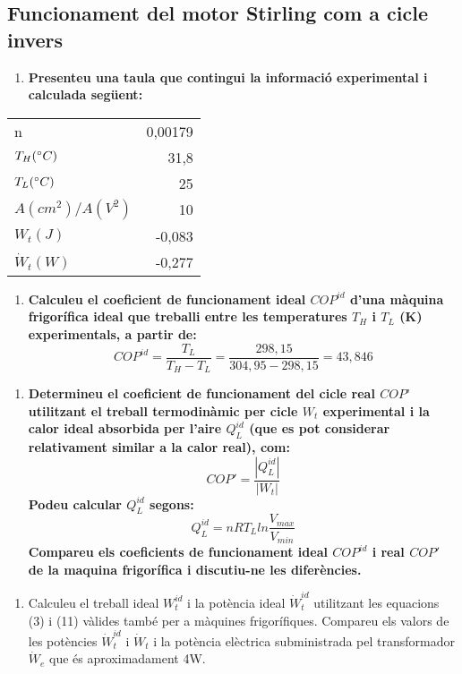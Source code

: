 \documentclass[a4paper]{article}
\begin{document}
\subsection{Funcionament del motor Stirling com a cicle invers}

\begin{enumerate}[resume]
	\item \textbf{Presenteu una taula que contingui la informació experimental i calculada següent:}
\end{enumerate}
\begin{table}[H]
	\centering
	\begin{tabular}{l|r}
		n &  0,00179 \\ 
		$T_H (\degree C)$ & 31,8 \\  
		$T_L (\degree C)$ & 25 \\ 
		$A(cm^2)/A(V^2)$ & 10 \\ 
		$W_t(J)$ & -0,083 \\ 
		$\dot{W}_t (W)$ & -0,277 \\
	\end{tabular}
\end{table}

\begin{enumerate}[resume]
	\item \textbf{Calculeu el coeficient de funcionament ideal $COP^{id}$ d'una màquina frigorífica ideal que treballi entre les temperatures $T_H$ i $T_L$ (K) experimentals, a partir de: }
	$$
	COP^{id} = \frac{T_L}{T_H - T_L} = \frac{298,15}{304,95 - 298,15} = 43,846
	$$
\end{enumerate}

\begin{enumerate}[resume]
	\item \textbf{Determineu el coeficient de funcionament del cicle real $COP’$ utilitzant el treball termodinàmic per cicle $W_t$ experimental i la calor ideal absorbida per l’aire $Q_L^{id}$ (que es pot considerar relativament similar a la calor real), com:}
	$$
	COP' = \frac{|Q_L^{id}|}{|W_t|}
	$$
	\textbf{Podeu calcular $Q_L^{id}$ segons:}
	$$
	Q_L^{id} = nRT_L ln \frac{V_{max}}{V_{min}}
	$$
	\textbf{Compareu els coeficients de funcionament ideal $COP^{id}$ i real $COP'$ de la maquina frigorífica i discutiu-ne les diferències.}
\end{enumerate}

\begin{enumerate}[resume]
	\item Calculeu el treball ideal $W_t^{id}$ i la potència ideal $\dot{W}_t^{id}$ utilitzant les equacions (3) i (11) vàlides també per a màquines frigorífiques. Compareu els valors de les potències $\dot{W}_t^{id}$ i $\dot{W}_t$ i la potència elèctrica subministrada pel transformador $\dot{W}_e$ que és aproximadament 4W.
\end{enumerate}
	
	
	
	
	
\end{document}
